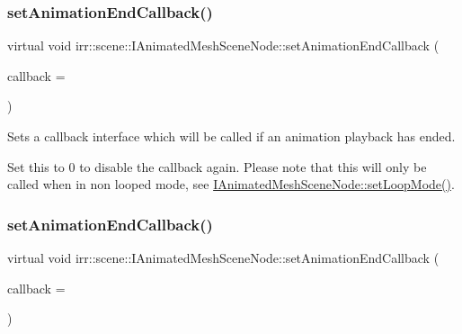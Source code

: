 \subsubsection{\texorpdfstring{set\+Animation\+End\+Callback()}{setAnimationEndCallback()}\hspace{0.1cm}{\footnotesize\ttfamily [1/2]}}
{\footnotesize\ttfamily virtual void irr\+::scene\+::\+I\+Animated\+Mesh\+Scene\+Node\+::set\+Animation\+End\+Callback (\begin{DoxyParamCaption}\item[{\hyperlink{classirr_1_1scene_1_1IAnimationEndCallBack}{I\+Animation\+End\+Call\+Back} $\ast$}]{callback = {} }\end{DoxyParamCaption})\hspace{0.3cm}{\ttfamily [pure virtual]}}



Sets a callback interface which will be called if an animation playback has ended. 

Set this to 0 to disable the callback again. Please note that this will only be called when in non looped mode, see \hyperlink{classirr_1_1scene_1_1IAnimatedMeshSceneNode_ae6cae051c74c3953061aa9e49e10cd06}{I\+Animated\+Mesh\+Scene\+Node\+::set\+Loop\+Mode()}. \mbox{\label{classirr_1_1scene_1_1IAnimatedMeshSceneNode_ad688bb5a7654116d1ee823e48393f1bd}} 
\subsubsection{\texorpdfstring{set\+Animation\+End\+Callback()}{setAnimationEndCallback()}\hspace{0.1cm}{\footnotesize\ttfamily [2/2]}}
{\footnotesize\ttfamily virtual void irr\+::scene\+::\+I\+Animated\+Mesh\+Scene\+Node\+::set\+Animation\+End\+Callback (\begin{DoxyParamCaption}\item[{\hyperlink{classirr_1_1scene_1_1IAnimationEndCallBack}{I\+Animation\+End\+Call\+Back} $\ast$}]{callback = {} }\end{DoxyParamCaption})\hspace{0.3cm}{\ttfamily [pure virtual]}}



